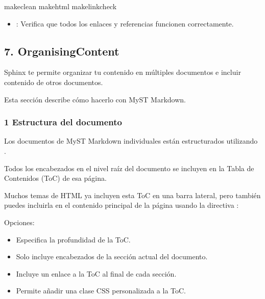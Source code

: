 \documentclass[a4paper,10pt,oneside,spanish,openany]{sphinxmanual}
\begin{document}
\begin{sphinxVerbatim}[commandchars=\\\{\}]
makeclean
makehtml
makelinkcheck
\end{sphinxVerbatim}
\begin{itemize}
\item {} 
\sphinxAtStartPar
{}: Verifica que todos los enlaces y referencias funcionen correctamente.

\end{itemize}


\subsection{7. Organising\sphinxhyphen{}Content}
\label{\detokenize{configuracion_inicial/013.guia_de_myst_parser:organising-content}}
\sphinxAtStartPar
Sphinx te permite organizar tu contenido en múltiples documentos e incluir contenido de otros documentos.

\sphinxAtStartPar
Esta sección describe cómo hacerlo con MyST Markdown.


\subsubsection{1 Estructura del documento}
\label{\detokenize{configuracion_inicial/013.guia_de_myst_parser:estructura-del-documento}}
\sphinxAtStartPar
Los documentos de MyST Markdown individuales están estructurados utilizando {\hyperref[\detokenize{configuracion_inicial/013.guia_de_myst_parser:tipografia.md:encabezados}]{}}.

\sphinxAtStartPar
Todos los encabezados en el nivel raíz del documento se incluyen en la Tabla de Contenidos (ToC) de esa página.

\sphinxAtStartPar
Muchos temas de HTML ya incluyen esta ToC en una barra lateral, pero también puedes incluirla en el contenido principal de la página usando la directiva :

\sphinxAtStartPar
Opciones:
\begin{itemize}
\item {} 
\sphinxAtStartPar
{} Especifica la profundidad de la ToC.

\item {} 
\sphinxAtStartPar
{} Solo incluye encabezados de la sección actual del documento.

\item {} 
\sphinxAtStartPar
{} Incluye un enlace a la ToC al final de cada sección.

\item {} 
\sphinxAtStartPar
{} Permite añadir una clase CSS personalizada a la ToC.

\end{itemize}
\end{document}
